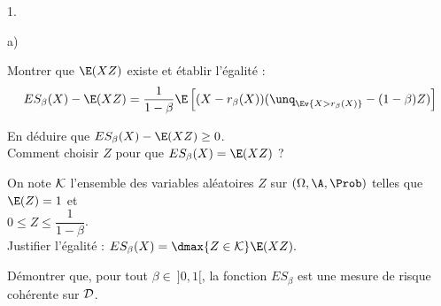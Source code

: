\begin{noliste}{1.}
\begin{noliste}{a)}
    

    
    \item Montrer que $\E(XZ)$ existe et établir l'égalité :
    \[
    ES_\beta(X) -\E(XZ) = \dfrac{1}{1-\beta} \E\left[(X-r_\beta(X))
      (\unq_{\Ev{X > r_\beta(X)}}-(1-\beta)Z)\right]
    \]
    
    
    
    
    
    
    \item En déduire que $ES_\beta(X)-\E(XZ) \geq 0$.\\
    Comment choisir $Z$ pour que $ES_\beta(X)=\E(XZ)$ ?
    
    
  \end{noliste}
  
  
  
  
  

  \item On note ${\cal K}$ l'ensemble des variables aléatoires $Z$ 
  sur $(\Omega,\A,\Prob)$ telles que $\E(Z)=1$ et \\
  $0\leq Z \leq \dfrac{1}{1-\beta}$.\\[.1cm]
  Justifier l'égalité : $ES_\beta(X)= \dmax{Z \in {\cal K}} 
  \E(XZ).$
  
  
  
  
  \item Démontrer que, pour tout $\beta \in \ ]0,1[$, la fonction 
  $ES_\beta$ est une mesure de risque cohérente sur ${\cal D}$.
  
  
\end{noliste}


